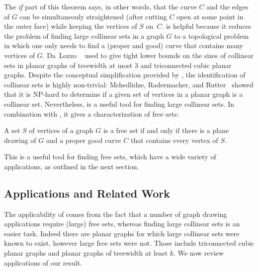 The \emph{if} part of this theorem says, in other words, that the
curve $C$ and the edges of $G$ can be simultaneouly straightened
 (after cutting $C$ open at
some point in the outer face)
while keeping the vertices of $S$ on~$C$.
%
  is helpful because it reduces the problem of
finding large collinear sets in a graph $G$ to a topological problem in
which one only needs to find a (proper and good) curve that contains many vertices
of $G$.  Da~Lozzo \etal~\cite{dalozzo.dujmovic.ea:drawing}
 used  to give
tight lower bounds on the sizes of collinear sets in planar graphs
of treewidth at most 3 and triconnected cubic planar graphs. Despite the conceptual simplification provided by ,
the identification of collinear sets is highly non-trivial:
Mchedlidze, Radermacher, and Rutter~%
\cite{mchedlidze.radermacher.ea:aligned} showed that it is NP-hard to
determine if a given set of vertices in a planar graph is a collinear
set.
%
Nevertheless,  is a useful tool for finding large 
collinear sets. In combination with , it gives a
characterization of free sets:
\begin{cor}
	A set $S$ of vertices of a graph $G$ is a free set if and
	only if there is a plane drawing of $G$ and a proper good curve $C$
	that contains every vertex of $S$.
      \end{cor}
This is a useful
tool for finding free sets, which have a wide variety of applications,
as outlined in the next section.


\subsection{Applications and Related Work}

The applicability of  comes from the fact that a number of graph drawing applications require (large) free sets, whereas finding large collinear sets
is an easier task. Indeed there are planar graphs for which large collinear sets were known to exist, however large free sets were not. Those include triconnected cubic planar graphs
and planar graphs of treewidth at least $k$.
%
We now review applications of our result. 


